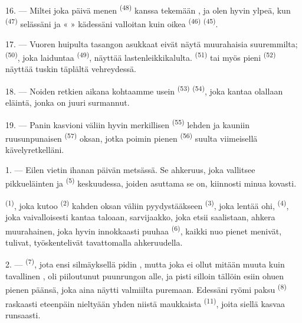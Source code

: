 \VUsaut{3.0mm}

16. --- Miltei joka päivä menen  \textsuperscript{(48)} kanssa
tekemään , ja olen hyvin ylpeä, kun 
\textsuperscript{(47)} selässäni ja «  » kädessäni valloitan
kuin oikea  \textsuperscript{(46)} 
\textsuperscript{(45)}.

17. --- Vuoren huipulta tasangon asukkaat eivät näytä muurahaisia
suuremmilta;  \textsuperscript{(50)}, joka laiduntaa
 \textsuperscript{(49)}, näyttää lastenleikkikalulta.
 \textsuperscript{(51)} tai myös pieni 
\textsuperscript{(52)} näyttää tuskin täplältä vehreydessä.

18. --- Noiden retkien aikana kohtaamme usein 
\textsuperscript{(53)}  \textsuperscript{(54)}, joka
kantaa olallaan eläintä, jonka on juuri surmannut.

19. --- Panin kasvioni väliin hyvin merkillisen 
\textsuperscript{(55)} lehden ja kauniin ruusunpunaisen 
\textsuperscript{(57)} oksan, jotka poimin pienen 
\textsuperscript{(56)} suulta viimeisellä kävelyretkelläni.

\VUsaut{3.0mm}
\VUsaut{3.0mm}

\VUsaut{3.0mm}

1. --- Eilen vietin ihanan päivän metsässä. Se ahkeruus, joka vallitsee
pikkueläinten ja  \textsuperscript{(5)} keskuudessa, joiden
asuttama se on, kiinnosti minua kovasti.

 \textsuperscript{(1)}, joka kutoo 
\textsuperscript{(2)} kahden oksan väliin pyydystääkseen 
\textsuperscript{(3)}, joka lentää ohi,  \textsuperscript{(4)},
joka vaivalloisesti kantaa taloaan, sarvijaakko, joka etsii saalistaan, ahkera
muurahainen, joka hyvin innokkaasti puuhaa 
\textsuperscript{(6)}, kaikki nuo pienet menivät, tulivat, työskentelivät
tavattomalla ahkeruudella.

2. ---  \textsuperscript{(7)}, jota ensi silmäyksellä pidin
, mutta joka ei ollut mitään muuta kuin tavallinen
, oli piiloutunut puunrungon alle, ja pisti silloin tällöin
esiin ohuen pienen päänsä, joka aina näytti valmiilta puremaan. Edessäni ryömi
paksu  \textsuperscript{(8)} raskaasti eteenpäin nieltyään yhden
niistä maukkaista  \textsuperscript{(11)}, joita siellä
kasvaa runsaasti.

